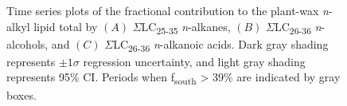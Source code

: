 \begin{figure}[p]
	\caption[Time-series plots of compound class contribution]{Time series plots of the fractional contribution to the plant-wax \textit{n}-alkyl lipid total by $(A)$ $\Sigma$LC\textsubscript{25-35} \textit{n}-alkanes, $(B)$ $\Sigma$LC\textsubscript{26-36} \textit{n}-alcohols, and $(C)$ $\Sigma$LC\textsubscript{26-36} \textit{n}-alkanoic acids. Dark gray shading represents $\pm 1 \sigma$ regression uncertainty, and light gray shading represents 95\% CI. Periods when f\textsubscript{south} > 39\% are indicated by gray boxes.}
	\label{Ch4Fig:9} 
\end{figure}

